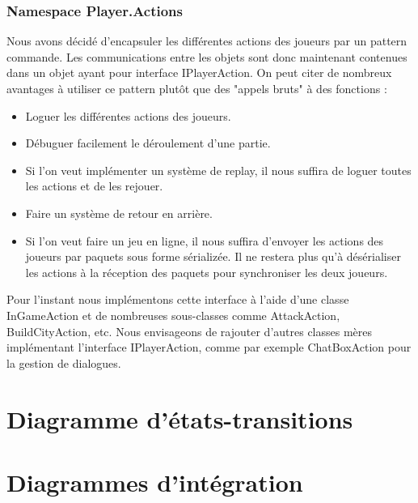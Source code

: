 				\subsubsection{Namespace Player.Actions}
Nous avons décidé d'encapsuler les différentes actions des joueurs par un pattern commande. 
Les communications entre les objets sont donc maintenant contenues dans un objet ayant pour interface IPlayerAction.
On peut citer de nombreux avantages à utiliser ce pattern plutôt que des "appels bruts" à des fonctions :
\begin{itemize}
\item Loguer les différentes actions des joueurs.
\item Débuguer facilement le déroulement d'une partie.
\item Si l'on veut implémenter un système de replay, il nous suffira de loguer toutes les actions et de les rejouer.
\item Faire un système de retour en arrière.
\item Si l'on veut faire un jeu en ligne, il nous suffira d'envoyer les actions des joueurs par paquets sous forme sérializée. Il ne restera plus qu'à 
désérialiser les actions à la réception des paquets pour synchroniser les deux joueurs.
\end{itemize}

Pour l'instant nous implémentons cette interface à l'aide d'une classe InGameAction et de nombreuses sous-classes comme AttackAction, BuildCityAction, etc.
Nous envisageons de rajouter d'autres classes mères implémentant l'interface IPlayerAction, comme par exemple ChatBoxAction pour la gestion de dialogues.

\section{Diagramme d'états-transitions}

\section{Diagrammes d'intégration}







































